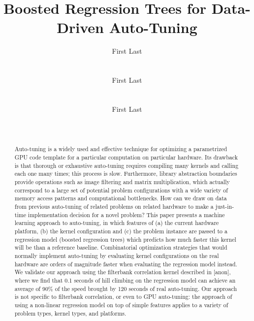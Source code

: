 \documentclass{sig-alternate}
\title{Boosted Regression Trees for Data-Driven Auto-Tuning}
\author{
\alignauthor First Last\\
\affaddr{Affiliation line 1}\\
\affaddr{Affiliation line 2}\\
\email{anon@mail.com}
\alignauthor First Last\\
\affaddr{Affiliation line 1}\\
\affaddr{Affiliation line 2}\\
\email{anon@mail.com}
\alignauthor First Last\\
\affaddr{Affiliation line 1}\\
\affaddr{Affiliation line 2}\\
\email{anon@mail.com}
}
\begin{document}
\maketitle

\begin{abstract}
Auto-tuning is a widely used and effective technique for optimizing a parametrized GPU code template for a particular computation on particular hardware.  Its drawback is that thorough or exhaustive auto-tuning requires compiling many kernels and calling each one many times; this process is slow.  Furthermore, library abstraction boundaries provide operations such as image filtering and matrix multiplication, which actually correspond to a large set of potential problem configurations with a wide variety of memory access patterns and computational bottlenecks.  How can we draw on data from previous auto-tuning of related problems on related hardware to make a just-in-time implementation decision for a novel problem?  This paper presents a machine learning approach to auto-tuning, in which features of (a) the current hardware platform, (b) the kernel configuration and (c) the problem instance are passed to a regression model (boosted regression trees) which predicts how much faster this kernel will be than a reference baseline.  Combinatorial optimization strategies that would normally implement auto-tuning by evaluating kernel configurations on the real hardware are orders of magnitude faster when evaluating the regression model instead.  We validate our approach using the filterbank correlation kernel described in [anon], where we find that 0.1 seconds of hill climbing on the regression model can achieve an average of 90\% of the speed brought by 120 seconds of real auto-tuning.  Our approach is not specific to filterbank correlation, or even to GPU auto-tuning: the approach of using a non-linear regression model on top of simple features applies to a variety of problem types, kernel types, and platforms.
\end{abstract}
\end{document}
